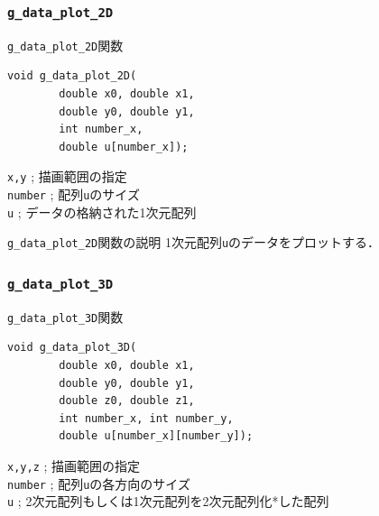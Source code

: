 \documentclass[platex,a4paper,12pt]{jsarticle}%
\begin{document}
\clearpage
\subsubsection{\texttt{g\_data\_plot\_2D}}

\begin{itembox}[l]{\texttt{g\_data\_plot\_2D}関数}
\begin{verbatim}
void g_data_plot_2D(
        double x0, double x1,
        double y0, double y1,
        int number_x,
        double u[number_x]);
\end{verbatim}
\verb|x,y| ; 描画範囲の指定\\
\verb|number| ; 配列\verb|u|のサイズ\\
\verb|u| ; データの格納された1次元配列
\end{itembox}

\begin{itembox}[l]{\texttt{g\_data\_plot\_2D}関数の説明}
1次元配列\verb|u|のデータをプロットする．
\end{itembox}



\clearpage
\subsubsection{\texttt{g\_data\_plot\_3D}}

\begin{itembox}[l]{\texttt{g\_data\_plot\_3D}関数}
\begin{verbatim}
void g_data_plot_3D(
        double x0, double x1,
        double y0, double y1,
        double z0, double z1,
        int number_x, int number_y,
        double u[number_x][number_y]);
\end{verbatim}
\verb|x,y,z| ; 描画範囲の指定\\
\verb|number| ; 配列\verb|u|の各方向のサイズ\\
\verb|u| ; 2次元配列もしくは1次元配列を2次元配列化*した配列
\end{itembox}
\end{document}

